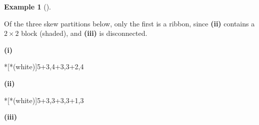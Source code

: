 \documentclass[numbers=enddot,12pt,final,onecolumn,notitlepage]{scrartcl}%
\theoremstyle{definition}
\newtheorem{exam}[theo]{Example}
\newenvironment{example}[1][]
{\begin{exam}[#1]\begin{leftbar}}
{\end{leftbar}\end{exam}}
\theoremstyle{plainsl}
\begin{document}






\begin{example}
\label{ribbontableaux}
Of the three skew partitions below, only the first is a ribbon, since \textbf{(ii)} contains a $2\times 2$ block (shaded), and \textbf{(iii)} is disconnected.

\begin{minipage}[t]{0.30\textwidth}
\begin{center}

\textbf{(i)}\vphantom{$\int^a$}
\end{center}
\end{minipage}
\begin{minipage}[t]{0.30\textwidth}
\begin{center}
*[*(white)]{5+3,4+3,3+2,4}

\textbf{(ii)}\vphantom{$\int^a$}
\end{center}
\end{minipage}
\begin{minipage}[t]{0.30\textwidth}
\begin{center}
*[*(white)]{5+3,3+3,3+1,3}

\textbf{(iii)}\vphantom{$\int^a$}
\end{center}
\end{minipage}


\end{example}
\end{document}

